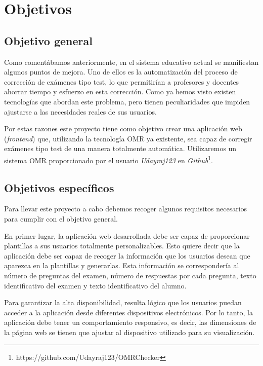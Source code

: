 \documentclass[a4paper, 12pt]{book}
\begin{document}
\cleardoublepage %
\chapter{Objetivos} %
\label{chap:objetivos} %

\section{Objetivo general} %
\label{sec:objetivo-general} %

Como comentábamos anteriormente, en el sistema educativo actual se manifiestan
algunos puntos de mejora. Uno de ellos es la automatización del proceso de
corrección de exámenes tipo test, lo que permitirían a profesores
y docentes ahorrar tiempo y esfuerzo en esta corrección. Como ya hemos visto
existen tecnologías que abordan este problema, pero tienen peculiaridades
que impiden ajustarse a las necesidades reales de sus usuarios.

Por estas razones este proyecto tiene como objetivo crear una aplicación
web (\textit{frontend}) que, utilizando la tecnología OMR ya existente, sea capaz de corregir exámenes tipo
test de una manera totalmente automática. Utilizaremos
un sistema OMR proporcionado por el usuario \textit{Udayraj123} en
\textit{Github}\footnote{https://github.com/Udayraj123/OMRChecker}.


\section{Objetivos específicos}
\label{sec:objetivos-especificos}

Para llevar este proyecto a cabo debemos recoger algunos
requisitos necesarios para cumplir con el objetivo general.

En primer lugar, la aplicación web desarrollada debe ser capaz de proporcionar
plantillas a sus usuarios totalmente personalizables. Esto quiere decir que
la aplicación debe ser capaz de recoger la información que los usuarios
desean que aparezca en la plantillas y generarlas. Esta información se
correspondería al número de preguntas del examen, número de respuestas por
cada pregunta, texto identificativo del examen y texto identificativo del
alumno.

Para garantizar la alta disponibilidad, resulta lógico que los usuarios
puedan acceder a la aplicación desde diferentes dispositivos electrónicos.
Por lo tanto, la aplicación debe tener un comportamiento responsivo, es decir,
las dimensiones de la página web se tienen que ajustar al dispositivo
utilizado para su visualización. 
\end{document}
